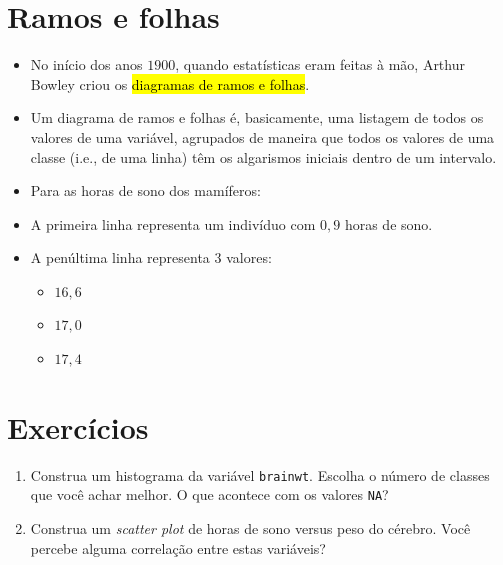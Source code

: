 \documentclass[
  11pt]{report}
\newenvironment{Shaded}{\begin{snugshade}}{\end{snugshade}}
\newcommand{\DocumentationTok}[1]{\textcolor[rgb]{0.56,0.35,0.01}{\textbf{\textit{#1}}}}
\newcommand{\FunctionTok}[1]{\textcolor[rgb]{0.00,0.00,0.00}{#1}}
\newcommand{\NormalTok}[1]{#1}
\newcommand{\SpecialCharTok}[1]{\textcolor[rgb]{0.00,0.00,0.00}{#1}}
\providecommand{\tightlist}{%
  \setlength{\itemsep}{0pt}\setlength{\parskip}{0pt}}
\begin{document}
\hypertarget{ramos-e-folhas}{%
\section{Ramos e folhas}\label{ramos-e-folhas}}

\begin{itemize}
\item
  No início dos anos \(1900\), quando estatísticas eram feitas à mão, Arthur Bowley criou os {\hl{diagramas de ramos e folhas}}.
\item
  Um diagrama de ramos e folhas é, basicamente, uma listagem de todos os valores de uma variável, agrupados de maneira que todos os valores de uma classe (i.e., de uma linha) têm os algarismos iniciais dentro de um intervalo.
\item
  Para as horas de sono dos mamíferos:

\begin{Shaded}
\end{Shaded}
\item
  A primeira linha representa um indivíduo com \(0{,}9\) horas de sono.
\item
  A penúltima linha representa \(3\) valores:

  \begin{itemize}
  \tightlist
  \item
    \(16{,}6\)
  \item
    \(17{,}0\)
  \item
    \(17{,}4\)
  \end{itemize}
\end{itemize}

\hypertarget{exercuxedcios-3}{%
\section{Exercícios}\label{exercuxedcios-3}}

\begin{enumerate}
\def\labelenumi{\arabic{enumi}.}
\item
  Construa um histograma da variável \texttt{brainwt}. Escolha o número de classes que você achar melhor. O que acontece com os valores \texttt{NA}?
\item
  Construa um \emph{scatter plot} de horas de sono versus peso do cérebro. Você percebe alguma correlação entre estas variáveis?
\end{enumerate}
\end{document}
